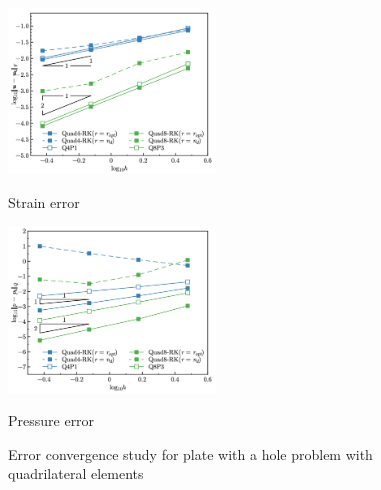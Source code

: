 \begin{figure}[H]
\centering
\begin{subcaptiongroup}
\centering
\parbox[b]{0.49\textwidth}{
    \includegraphics[width=0.49\textwidth]{png/plate_with_hole_quad_Hdev.png}
    \caption{Strain error}\label{fg:plate_with_hole_convergence_strain_quad}
}
\parbox[b]{0.49\textwidth}{
    \includegraphics[width=0.49\textwidth]{png/plate_with_hole_quad_L2_p.png}
    \caption{Pressure error}\label{fg:plate_with_hole_convergence_pressure_quad}
}
\end{subcaptiongroup}
\caption{Error convergence study for plate with a hole problem with quadrilateral elements}\label{fg:plate_with_hole_convergence_quad}
\end{figure}

